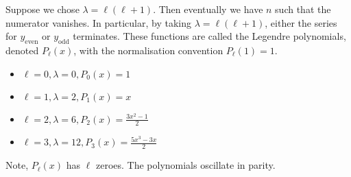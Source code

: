Suppose we chose \( \lambda = \ell (\ell + 1) \).
Then eventually we have \( n \) such that the numerator vanishes.
In particular, by taking \( \lambda = \ell (\ell + 1) \), either the series for \( y_{\text{even}} \) or \( y_{\text{odd}} \) terminates.
These functions are called the Legendre polynomials, denoted \( P_\ell(x) \), with the normalisation convention \( P_\ell(1) = 1 \).
\begin{itemize}
	\item \( \ell = 0, \lambda = 0, P_0(x) = 1 \)
	\item \( \ell = 1, \lambda = 2, P_1(x) = x \)
	\item \( \ell = 2, \lambda = 6, P_2(x) = \frac{3x^2 - 1}{2} \)
	\item \( \ell = 3, \lambda = 12, P_3(x) = \frac{5x^3 - 3x}{2} \)
\end{itemize}
Note, \( P_\ell(x) \) has \( \ell \) zeroes.
The polynomials oscillate in parity.

